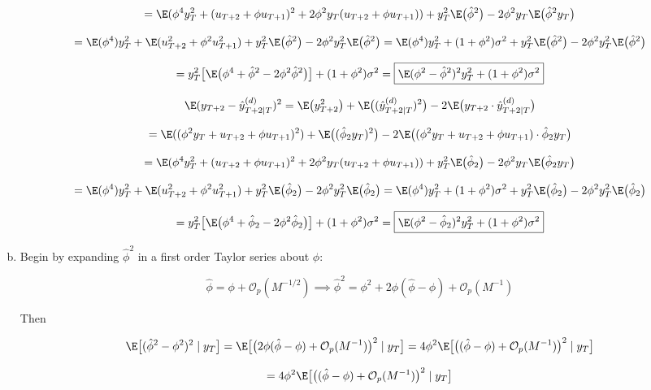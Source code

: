 \begin{enumerate}[(a)]
\[
= \E(\phi^4 y_T^2 + (u_{T+2} + \phi u_{T+1})^2 + 2\phi^2 y_T( u_{T+2} + \phi u_{T+1})) + y_{T}^2 \E \big(\hat{\phi}^2 \big)  -2\phi^2 y_T \E \big(  \hat{\phi}^2y_{T}\big) 
\]

\[
= \E(\phi^4)  y_T^2+ \E(u_{T+2}^2 + \phi^2 u_{T+1}^2 ) + y_{T}^2 \E \big(\hat{\phi}^2 \big)  -2\phi^2 y_T^2 \E \big(  \hat{\phi}^2\big)  = \E(\phi^4)  y_T^2+ (1 + \phi^2)\sigma^2 + y_{T}^2 \E \big(\hat{\phi}^2 \big)  -2\phi^2 y_T^2 \E \big(  \hat{\phi}^2\big) 
\]

\[
= y_T^2 \big[ \E \big(\phi^4   +\hat{\phi}^2 -2  \phi^2 \hat{\phi}^2\big) \big] + (1 + \phi^2)\sigma^2 = \boxed{\E(\phi^2 - \hat{\phi}^2)^2 y_T^2 + (1 + \phi^2) \sigma^2}
\]

%
%
%
%
%
%

\[
\E(y_{T+2} - \hat{y}_{T+2\mid T}^{(d)})^2 = \E\big(y_{T+2}^2\big) + \E \big((\hat{y}_{T+2\mid T}^{(d)})^2 \big)  -2 \E \big(y_{T+2} \cdot \hat{y}_{T+2\mid T}^{(d)}\big) 
\]

\[
= \E((\phi^2 y_T + u_{T+2} + \phi u_{T+1})^2) + \E \big((\hat{\phi}_2y_{T})^2 \big)  -2 \E \big((\phi^2 y_T + u_{T+2} + \phi u_{T+1}) \cdot \hat{\phi}_2y_{T}\big) 
\]

\[
= \E(\phi^4 y_T^2 + (u_{T+2} + \phi u_{T+1})^2 + 2\phi^2 y_T( u_{T+2} + \phi u_{T+1})) + y_{T}^2 \E \big(\hat{\phi}_2 \big)  -2\phi^2 y_T \E \big(  \hat{\phi}_2y_{T}\big) 
\]

\[
= \E(\phi^4)  y_T^2+ \E(u_{T+2}^2 + \phi^2 u_{T+1}^2 ) + y_{T}^2 \E \big(\hat{\phi}_2 \big)  -2\phi^2 y_T^2 \E \big(  \hat{\phi}_2\big)  = \E(\phi^4)  y_T^2+ (1 + \phi^2)\sigma^2 + y_{T}^2 \E \big(\hat{\phi}_2 \big)  -2\phi^2 y_T^2 \E \big(  \hat{\phi}_2\big) 
\]

\[
= y_T^2 \big[ \E \big(\phi^4   +\hat{\phi}_2 -2  \phi^2 \hat{\phi}_2\big) \big] + (1 + \phi^2)\sigma^2 = \boxed{\E(\phi^2 - \hat{\phi}_2)^2 y_T^2 + (1 + \phi^2) \sigma^2}
\]

\item Begin by expanding \(\hat{\phi}^2\) in a first order Taylor series about \(\phi\):

\[
\hat{\phi} = \phi + \mathcal{O}_p(M^{-1/2}) \implies \hat{\phi}^2 = \phi^2 + 2 \phi(\hat{\phi} - \phi) + \mathcal{O}_p(M^{-1})
\]

Then

\[
\E\big[ (\hat{\phi}^2 - \phi^2)^2 \mid y_T \big] = \E\big[ \big( 2 \phi(\hat{\phi} - \phi) + \mathcal{O}_p(M^{-1}) \big)^2 \mid y_T \big] = 4 \phi^2 \E\big[ \big( (\hat{\phi} - \phi) + \mathcal{O}_p(M^{-1}) \big)^2 \mid y_T \big] 
\]

\[
= 4 \phi^2 \E\big[ \big( (\hat{\phi} - \phi) + \mathcal{O}_p(M^{-1}) \big)^2 \mid y_T \big] 
\]

\end{enumerate}


